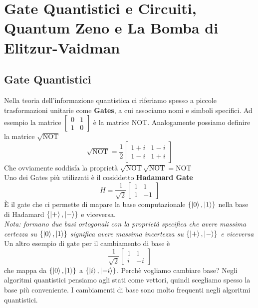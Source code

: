 \documentclass{article}
\begin{document}
    \section{Gate Quantistici e Circuiti, Quantum Zeno e La Bomba di Elitzur-Vaidman}
    \subsection{Gate Quantistici}
    Nella teoria dell'informazione quantistica ci riferiamo spesso a piccole trasformazioni unitarie come \textbf{Gates}, a cui associamo nomi e simboli specifici. Ad esempio la matrice $\begin{bmatrix}
        0 & 1 \\1 & 0
    \end{bmatrix}$
    è la matrice NOT. Analogamente possiamo definire la matrice $\sqrt{\text{NOT}}$
    \begin{equation}
    \sqrt{\text{NOT}} = \frac{1}{2} \begin{bmatrix}
        1+i &1-i \\ 1-i & 1+i
    \end{bmatrix}
    \end{equation}
    Che ovviamente soddisfa la proprietà $\sqrt{\text{NOT}} \sqrt{\text{NOT}} = \text{NOT}$
    \medskip
    \\ Uno dei Gates più utilizzati è il cosiddetto \textbf{Hadamard Gate}
    \begin{equation}
        H = \frac{1}{\sqrt{2}}\begin{bmatrix}
            1 & 1\\ 1 & -1
        \end{bmatrix} 
    \end{equation}
    È il gate che ci permette di mapare la base computazionale $\{\ket{0},\ket{1}\}$ nella base di Hadamard $\{\ket{+},\ket{-}\}$ e viceversa.
    \medskip
    \\ \textit{Nota: formano due basi ortogonali con la proprietà specifica che avere massima certezza su $\{\ket{0},\ket{1}\}$ significa avere massima incertezza su $\{\ket{+},\ket{-}\}$ e viceversa}
    \medskip
    \\ Un altro esempio di gate per il cambiamento di base è
    \begin{equation}
    \frac{1}{\sqrt{2}}
    \begin{bmatrix}
        1 & 1 \\ i &-i
    \end{bmatrix}
    \end{equation}
    che mappa da $\{\ket{0},\ket{1}\}$ a $\{\ket{i},\ket{-i}\}$. Perchè vogliamo cambiare base? Negli algoritmi quantistici pensiamo agli stati come vettori, quindi scegliamo spesso la base più conveniente. I cambiamenti di base sono molto frequenti negli algoritmi quantistici.
\end{document}
